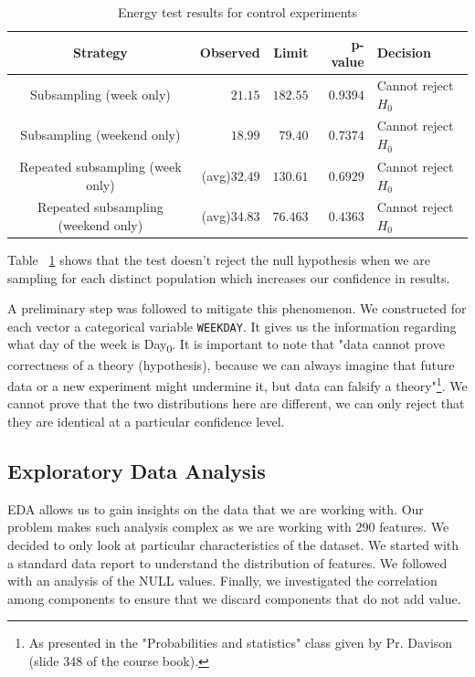 \begin{table}[h]
\begin{center}
\begin{tabular}{c r r r l}
\hline
\textbf{Strategy} & \textbf{Observed} & \textbf{Limit} & \textbf{p-value} & \textbf{Decision}\\ 
\hline\hline
Subsampling (week only) &  $21.15$ & $182.55$ & $0.9394$ & Cannot reject $H_0$\\
\hline
Subsampling (weekend only) &  $18.99$ & $79.40$ & $0.7374$ & Cannot reject $H_0$\\
\hline\hline
Repeated subsampling (week only) & (avg)$32.49$ & $130.61$ & $0.6929$ & Cannot reject $H_0$\\
\hline
Repeated subsampling (weekend only) & (avg)$34.83$ & $76.463$ & $0.4363$ & Cannot reject $H_0$\\
\end{tabular}
\end{center}
\caption{\label{hyp_test_control}Energy test results for control experiments}
\end{table}

Table ~\ref{hyp_test_control} shows that the test doesn't reject the null hypothesis when we are sampling for each distinct population which increases our confidence in results. 

\vspace{1\baselineskip}A preliminary step was followed to mitigate this phenomenon. We constructed for each vector a categorical variable \texttt{WEEKDAY}. It gives us the information regarding what day of the week is Day\textsubscript{0}. It is important to note that "data cannot prove correctness of a theory (hypothesis), because we can always imagine that future data or a new experiment might undermine it, but data can falsify a theory"\footnote{As presented in the "Probabilities and statistics" class given by Pr. Davison (slide 348 of the course book).}. We cannot prove that the two distributions here are different, we can only reject that they are identical at a particular confidence level. 

\subsection{Exploratory Data Analysis}
EDA allows us to gain insights on the data that we are working with. Our problem makes such analysis complex as we are working with 290 features. We decided to only look at particular characteristics of the dataset. We started with a standard data report to understand the distribution of features. We followed with an analysis of the NULL values. Finally, we investigated the correlation among components to ensure that we discard components that do not add value. 

